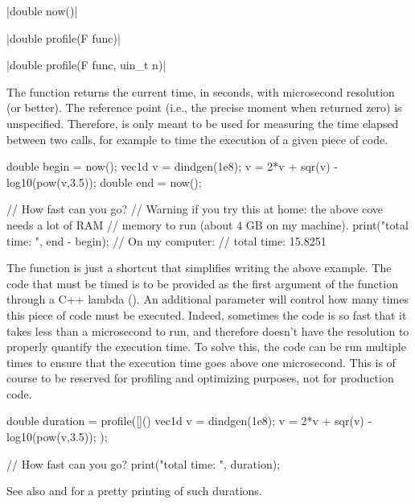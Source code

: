 \funcitem \cppinline|double now()| 

\cppinline|double profile(F func)| 

\cppinline|double profile(F func, uin_t n)|

The function  returns the current time, in seconds, with microsecond resolution (or better). The reference point (i.e., the precise moment when  returned zero) is unspecified. Therefore,  is only meant to be used for measuring the time elapsed between two calls, for example to time the execution of a given piece of code.

\begin{example}
\begin{cppcode}
double begin = now();
vec1d v = dindgen(1e8);
v = 2*v + sqr(v) - log10(pow(v,3.5));
double end = now();

// How fast can you go?
// Warning if you try this at home: the above cove needs a lot of RAM
// memory to run (about 4 GB on my machine).
print("total time: ", end - begin);
// On my computer:
// total time: 15.8251
\end{cppcode}
\end{example}

The function  is just a shortcut that simplifies writing the above example. The code that must be timed is to be provided as the first argument of the function through a C++ lambda (). An additional parameter  will control how many times this piece of code must be executed. Indeed, sometimes the code is so fast that it takes less than a microsecond to run, and therefore  doesn't have the resolution to properly quantify the execution time. To solve this, the code can be run multiple times to ensure that the execution time goes above one microsecond. This is of course to be reserved for profiling and optimizing purposes, not for production code.

\begin{example}
\begin{cppcode}
double duration = profile([]() {
    vec1d v = dindgen(1e8);
    v = 2*v + sqr(v) - log10(pow(v,3.5));
});

// How fast can you go?
print("total time: ", duration);
\end{cppcode}
\end{example}

See also  and  for a pretty printing of such durations.



